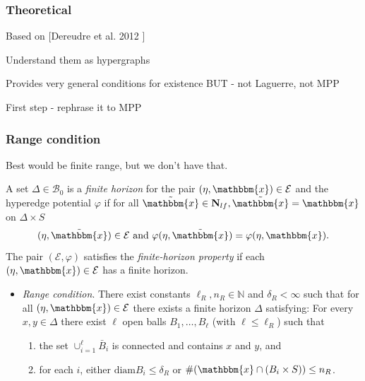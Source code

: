 \documentclass[c, 10pt]{beamer}
\newcommand{\x}{{\mathbbm{x}}}
\begin{document}
\begin{frame}\frametitle{Theoretical}
	Based on [Dereudre et al. 2012 ] 

	Understand them as hypergraphs


	Provides very general conditions for existence
	BUT - not Laguerre, not MPP

	First step - rephrase it to MPP
\end{frame}






\begin{frame}\frametitle{Range condition}

	Best would be finite range, but we don't have that.



\begin{definition}
	A set $\Delta \in \mathcal B_0$ is a \textit{finite horizon} for the pair $(\eta,\x) \in \mathcal E$ and the hyperedge potential $\varphi$ if for all $\tilde{\x} \in \mathbf N_{lf}, \tilde{\x} = \x$ on $\Delta\times S$ 
$$(\eta,\tilde{\x})\in\mathcal E \text{ and } \varphi(\eta,\tilde{\x}) = \varphi(\eta,\x). $$
The pair $(\mathcal E, \varphi)$ satisfies the \textit{finite-horizon property} if each $(\eta,\x)\in \mathcal E$ has a finite horizon.
\end{definition}

\begin{itemize}
	\item \textit{Range condition}. There exist constants $\ell_R,n_R \in \mathbb N$ and $\delta_R < \infty$ such that for all $(\eta,\x) \in \mathcal E$ there exists a finite horizon $\Delta$ satisfying: For every $x,y \in \Delta$ there exist $\ell$ open balls $B_1, \dots, B_\ell$ (with $\ell \leq \ell_R$) such that
	\begin{enumerate}[-]
		\item the set $\cup^\ell_{i=1} \bar B_i$ is connected and contains $x$ and $y$, and 
		\item for each $i$, either $\text{diam} B_i \leq \delta_R$ or $\# (\x \cap (B_i\times S)) \leq n_R$.
	\end{enumerate}
\end{itemize}
\end{frame}
\end{document}
